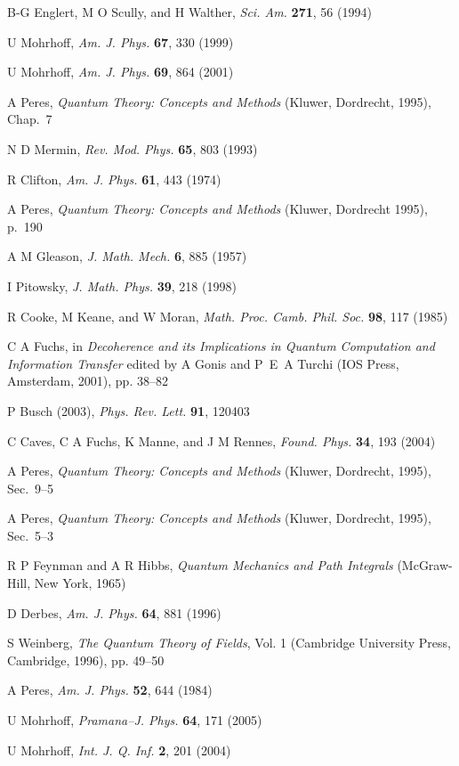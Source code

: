 \documentclass[12pt]{article}
\begin{document}
\begin{thebibliography}{00}
B-G Englert, M O Scully, and H Walther, \textit{Sci. Am.} \textbf{271}, 56 (1994)
 
U Mohrhoff, \textit{Am. J. Phys.} \textbf{67}, 330 (1999)

U Mohrhoff, \textit{Am. J. Phys.} \textbf{69}, 864 (2001)

A Peres, \textit{Quantum Theory: Concepts and Methods} (Kluwer, Dordrecht, 1995), Chap.~7

N D Mermin, \textit{Rev. Mod. Phys.} \textbf{65}, 803 (1993)

R Clifton, \textit{Am. J. Phys.} \textbf{61}, 443 (1974)

A Peres, \textit{Quantum Theory: Concepts and Methods} (Kluwer, Dordrecht 1995), p.~190

A M Gleason, \textit{J. Math. Mech.} \textbf{6}, 885 (1957)

I Pitowsky, \textit{J. Math. Phys.} \textbf{39}, 218 (1998)

R Cooke, M Keane, and W Moran, \textit{Math. Proc. Camb. Phil. Soc.} \textbf{98}, 117 (1985)

C A Fuchs, in \textit{Decoherence and its Implications in Quantum Computation and Information Transfer} edited by A Gonis and P~E~A Turchi (IOS Press, Amsterdam, 2001), pp. 38--82

P Busch (2003), \textit{Phys. Rev. Lett.} \textbf{91}, 120403

C Caves, C A Fuchs, K Manne, and J M Rennes, \textit{Found. Phys.} \textbf{34}, 193 (2004)

A Peres, \textit{Quantum Theory: Concepts and Methods} (Kluwer, Dordrecht, 1995), Sec.~9--5

A Peres, \textit{Quantum Theory: Concepts and Methods} (Kluwer, Dordrecht, 1995), Sec.~5--3

R P Feynman and A R Hibbs, \textit{Quantum Mechanics and Path Integrals} (McGraw-Hill, New York, 1965)

D Derbes, \textit{Am. J. Phys.} \textbf{64}, 881 (1996)

S Weinberg, \textit{The Quantum Theory of Fields}, Vol. 1 (Cambridge University Press, Cambridge,  1996), pp. 49--50

A Peres, \textit{Am. J. Phys.} \textbf{52}, 644 (1984)

U Mohrhoff, \textit{Pramana--J. Phys.} \textbf{64}, 171 (2005)

U Mohrhoff, \textit{Int. J. Q. Inf.} \textbf{2}, 201 (2004)

\end{thebibliography}
\end{document}
